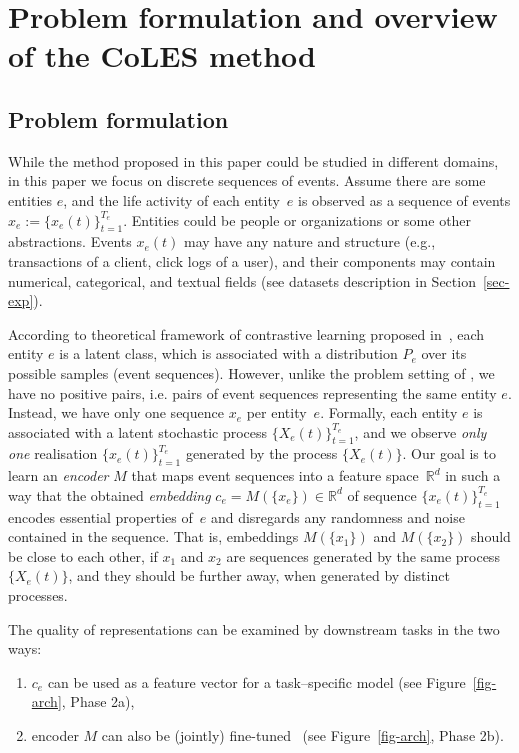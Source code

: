 \documentclass[sigconf, anonymous]{acmart}
\newcommand{\R}{\mathbb{R}}
\begin{document}
\section{Problem formulation and overview of the CoLES method} \label{sec-method}

\subsection{Problem formulation} \label{sec:problem setting}

While the method proposed in this paper could be studied in different domains, in this paper we focus on discrete sequences of events. Assume there are some entities $e$, and the life activity of each entity~$e$ is observed as a sequence of events $x_e:=\{x_e(t)\}^{T_e}_{t=1}$. Entities could be people or organizations or some other abstractions. Events $x_e(t)$ may have any nature and structure (e.g., transactions of a client, click logs of a user), and their components may contain numerical, categorical, and textual fields (see datasets description in Section~\ref{sec-exp}). 

According to theoretical framework of contrastive learning proposed in~\cite{Saunshi2019ICML}, each entity $e$ is a latent class, which is associated with a distribution $P_e$ over its possible samples (event sequences). However, unlike the problem setting of \cite{Saunshi2019ICML}, we have no positive pairs, i.e. pairs of event sequences representing the same entity $e$. Instead, we have only one sequence $x_e$ per entity~$e$. Formally, each entity $e$ is associated with a latent stochastic process $\{X_e(t)\}_{t=1}^{T_e}$, and we observe {\it only one} realisation $\{x_e(t)\}_{t=1}^{T_e}$ generated by the process $\{X_e(t)\}$. Our goal is to learn an \textit{encoder} $M$ that maps event sequences into a feature space~$\R^d$ in such a way that the obtained \textit{embedding} $c_e=M(\{x_e\})\in \R^d$ of sequence $\{x_e(t)\}^{T_e}_{t=1}$ encodes essential properties of~$e$ and disregards any randomness and noise contained in the sequence. That is, embeddings $M(\{x_1\})$ and $M(\{x_2\})$ should be close to each other, if $x_1$ and $x_2$ are sequences generated by the same process $\{X_e(t)\}$, and they should be further away, when generated by distinct processes. 

The quality of representations can be examined by downstream tasks in the two ways:
\begin{enumerate}
\item $c_e$ can be used as a feature vector for a task--specific model (see Figure~\ref{fig-arch}, Phase 2a),
\item encoder $M$ can also be (jointly) fine-tuned~\citep{Yosinski2014HowTA} (see Figure~\ref{fig-arch}, Phase 2b).
\end{enumerate}
\end{document}
